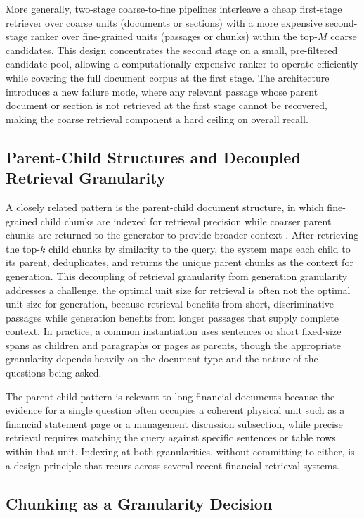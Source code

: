 \documentclass[12pt,twoside,maitrise]{dms}
\theoremstyle{definition}
\numberwithin{equation}{section}
\numberwithin{table}{chapter}
\numberwithin{figure}{chapter}
\begin{document}
More generally, two-stage coarse-to-fine pipelines interleave a cheap first-stage
retriever over coarse units (documents or sections) with a more expensive second-stage
ranker over fine-grained units (passages or chunks) within the top-$M$ coarse candidates.
This design concentrates the second stage on a small, pre-filtered candidate pool,
allowing a computationally expensive ranker to operate efficiently while covering the
full document corpus at the first stage. The architecture introduces a new failure mode, where any relevant passage whose parent document or section is not retrieved at the
first stage cannot be recovered, making the coarse retrieval component a hard ceiling on
overall recall.

\subsection{Parent-Child Structures and Decoupled Retrieval Granularity}

A closely related pattern is the parent-child document structure, in which fine-grained
child chunks are indexed for retrieval precision while coarser parent chunks are returned
to the generator to provide broader context \citep{gao2023retrieval}. After retrieving
the top-$k$ child chunks by similarity to the query, the system maps each child to its
parent, deduplicates, and returns the unique parent chunks as the context for generation.
This decoupling of retrieval granularity from generation granularity addresses a challenge, the optimal unit size for retrieval is often not the optimal unit size for
generation, because retrieval benefits from short, discriminative passages while
generation benefits from longer passages that supply complete context. In practice, a
common instantiation uses sentences or short fixed-size spans as children and paragraphs
or pages as parents, though the appropriate granularity depends heavily on the document
type and the nature of the questions being asked.

The parent-child pattern is relevant to long financial documents because the evidence
for a single question often occupies a coherent physical unit such as a financial
statement page or a management discussion subsection, while precise retrieval requires
matching the query against specific sentences or table rows within that unit. Indexing
at both granularities, without committing to either, is a design principle that recurs
across several recent financial retrieval systems.

\subsection{Chunking as a Granularity Decision}
\label{sec:chunking_lit}
\end{document}

